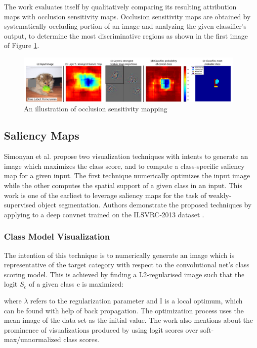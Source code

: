 \documentclass[../report.tex]{subfiles}
\begin{document}
    The work evaluates itself by qualitatively comparing its resulting attribution maps with occlusion sensitivity maps. Occlusion sensitivity maps are obtained by systematically occluding portion of an image and analyzing the given classifier’s output, to determine the most discriminative regions as shown in the first image of Figure \ref{osm}.
    \begin{figure}[ht!]
    \includegraphics[width=\textwidth]{images/occlusion_sensitivity_map}
    \caption{An illustration of occlusion sensitivity mapping}
    \label{osm}
\end{figure}
    
    
    
 \subsection{Saliency Maps}
 Simonyan et al. \cite{simonyan2013deep} propose two visualization techniques with intents to generate an image which maximizes the class score, and to compute a class-specific saliency map for a given input. The first technique numerically optimizes the input image while the other computes the spatial support of a given class in an input. This work is one of the earliest to leverage saliency maps for the task of weakly-supervised object segmentation. Authors demonstrate the proposed techniques by applying to a deep convnet trained on the ILSVRC-2013 dataset \cite{ILSVRC15}.
 
 \subsubsection{Class Model Visualization}
 The intention of this technique is to numerically generate an image which is representative of the target category with respect to the convolutional net’s class scoring model. This is achieved by finding a L2-regularised image such that the logit $S_{c}$  of a given class c is maximized:
 
 	
 
 where  $\lambda$ refers to the regularization parameter and I is a local optimum, which can be found with help of back propagation. The optimization process uses the mean image of the data set as the initial value. The work also mentions about the prominence of visualizations produced by using logit scores over soft-max/unnormalized class scores.   
    
\end{document}
